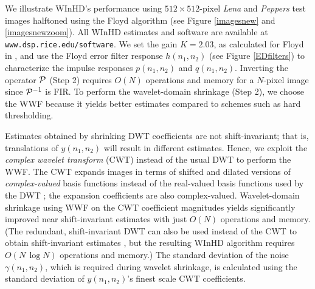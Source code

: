 \documentclass[11pt]{article}
\def\nnnx {n_1}
\def\nnny {n_2}
\def\NSQ{N}
\def\cP { {\cal{P}} }
\begin{document}
\sloppy We illustrate \mbox{WInHD}'s performance using $512 \times
512$-pixel {\em Lena } and {\em Peppers} test images halftoned using
the Floyd algorithm \cite{Floyd} (see Figure \ref{imagesnew} and
\ref{imagesnewzoom}).  All WInHD estimates and software are available
at {\tt www.dsp.rice.edu/software}. We set the gain $K = 2.03$, as
calculated for Floyd in \cite{Kite,KiteJournal}, and use the Floyd
error filter response $h(\nnnx,\nnny)$ (see Figure \ref{EDfilters}) to
characterize the impulse responses $p(\nnnx,\nnny)$ and
$q(\nnnx,\nnny)$. Inverting the operator $\cP$ (Step 2) requires
$O(\NSQ)$ operations and memory for a $\NSQ$-pixel image since
$\cP^{-1}$ is FIR. To perform the wavelet-domain shrinkage (Step 2),
we choose the WWF because it yields better estimates compared to
schemes such as hard thresholding.

Estimates obtained by shrinking DWT coefficients are not
shift-invariant; that is, translations of $y(\nnnx,\nnny)$ will result
in different estimates. Hence, we exploit the {\em complex wavelet
transform} (CWT) instead of the usual DWT to perform the WWF. The CWT
expands images in terms of shifted and dilated versions of {\em
complex-valued} basis functions instead of the real-valued basis
functions used by the DWT \cite{kingsbury01co,justinchmt}; the
expansion coefficients are also complex-valued. Wavelet-domain
shrinkage using WWF on the CWT coefficient magnitudes yields
significantly improved near shift-invariant estimates with just
$O(\NSQ)$ operations and memory. (The redundant, shift-invariant DWT
can also be used instead of the CWT to obtain shift-invariant
estimates \cite{mallat-new}, but the resulting WInHD algorithm
requires $O(\NSQ \,\log{N})$ operations and memory.) The standard
deviation of the noise $\gamma(\nnnx,\nnny)$, which is required during
wavelet shrinkage, is calculated using the standard deviation of
$y(\nnnx,\nnny)$'s finest scale CWT coefficients.
\end{document}
